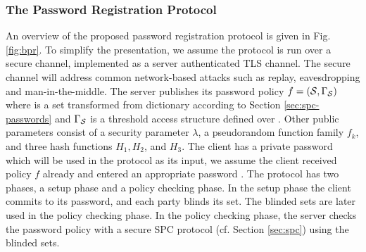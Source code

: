 
\subsubsection{The Password Registration Protocol}

An overview of the proposed password registration protocol is given in Fig. \ref{fig:bpr}. 
To simplify the presentation, we assume the protocol is run over a secure channel, \eg implemented as a server authenticated \ac{TLS} channel. 
The secure channel will address common network-based attacks such as replay, eavesdropping and man-in-the-middle. 
The server publishes its password policy $f=(\mathcal{S},\Gamma_\mathcal{S})$ where \cS is a set transformed from dictionary \cD according to Section \ref{sec:spc-passwords} and $\Gamma_\mathcal{S}$ is a threshold access structure defined over \cS. 
Other public parameters consist of a security parameter $\lambda$, a pseudorandom function family $f_k$, and three hash functions $H_1, H_2$, and $H_3$. 
The client has a private password \pwd which will be used in the protocol as its input, \ie we assume the client received policy $f$ already and entered an appropriate password \pwd. 
The protocol has two phases, a setup phase and a policy checking phase. 
In the setup phase the client commits to its password, and each party blinds its set. 
The blinded sets are later used in the policy checking phase. In the policy checking phase, the server checks the password policy with a secure \ac{SPC} protocol (cf. Section \ref{sec:spc}) using the blinded sets.

